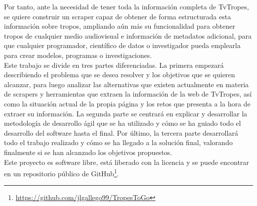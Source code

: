 Por tanto, ante la necesidad de tener toda la información completa de TvTropes, se quiere construir un scraper capaz de obtener de forma estructurada esta información sobre tropos, ampliando aún más su funcionalidad para obtener tropos de cualquier medio audiovisual e información de metadatos adicional, para que cualquier programador, científico de datos o investigador pueda emplearla para crear modelos, programas o investigaciones.\\

Este trabajo se divide en tres partes diferenciadas. La primera empezará describiendo el problema que se desea resolver y los objetivos que se quieren alcanzar, para luego analizar las alternativas que existen actualmente en materia de scrapers y herramientas que extraen la información de la web de TvTropes, así como la situación actual de la propia página y los retos que presenta a la hora de extraer su información. La segunda parte se centrará en explicar y desarrollar la metodología de desarrollo ágil que se ha utilizado y cómo se ha guiado todo el desarrollo del software hasta el final. Por último, la tercera parte desarrollará todo el trabajo realizado y cómo se ha llegado a la solución final, valorando finalmente si se han alcanzado los objetivos propuestos.\\

Este proyecto es software libre, está liberado con la licencia \cite{gplv3} y se puede encontrar en un repositorio público de GitHub\footnote{\url{https://github.com/jlgallego99/TropesToGo}}.
